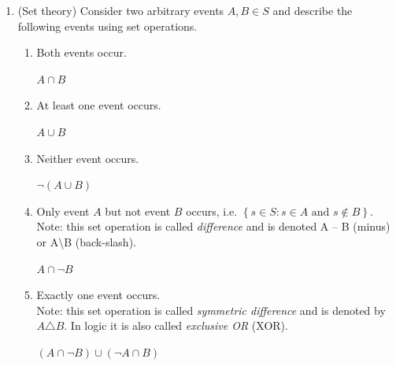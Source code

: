 \documentclass[11pt]{article}
\begin{document}
\begin{enumerate}
		\item (Set theory) Consider two arbitrary events $ A, B \in S $ and describe the following events using set operations.
			\begin{enumerate}
				\item Both events occur.
					\begin{mdframed}
						$ A \cap B $
					\end{mdframed}
				\item At least one event occurs.
					\begin{mdframed}
						$ A \cup B $
					\end{mdframed}
				\item Neither event occurs.
					\begin{mdframed}
						$ \neg \left( A \cup B \right)  $
					\end{mdframed}
				\item Only event $ A $ but not event $ B $ occurs, i.e. $ \left\lbrace s \in S : s \in A \text{ and } s \notin B \right\rbrace $.\\
				Note: this set operation is called \textit{difference} and is denoted A -- B (minus) or A\textbackslash B (back-slash).
					\begin{mdframed}
						$ A \cap \neg B $
					\end{mdframed}
				\item Exactly one event occurs.\\
				Note: this set operation is called \textit{symmetric difference} and is denoted by $ A\triangle B $. In logic it is also called \textit{exclusive OR} (XOR).
				\begin{mdframed}
					$ \left( A \cap \neg B \right) \cup \left( \neg A \cap B \right) $
				\end{mdframed}
			\end{enumerate}


\end{enumerate}
\end{document}
